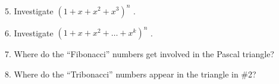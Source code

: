 \documentclass[10pt,]{book}
\theoremstyle{plain}
\theoremstyle{definition}
\theoremstyle{definition}
\theoremstyle{definition}
\numberwithin{equation}{chapter}
\begin{document}
\begin{exerciselist}
\par\smallskip
\item[5.]\hypertarget{exercise-31}{}\hypertarget{p-1706}{}%
Investigate \(\left( 1 + x + x^{2} + x^{3} \right)^{n}\) .%
\par\smallskip
\item[6.]\hypertarget{exercise-32}{}\hypertarget{p-1707}{}%
Investigate \(\left( 1 + x + x^{2} + \ldots + x^{k} \right)^{n}\) .%
\par\smallskip
\item[7.]\hypertarget{exercise-33}{}\hypertarget{p-1708}{}%
Where do the ``Fibonacci'' numbers get involved in the Pascal triangle?%
\par\smallskip
\item[8.]\hypertarget{exercise-34}{}\hypertarget{p-1709}{}%
Where do the ``Tribonacci'' numbers appear in the triangle in \#2?%
\par\smallskip
\end{exerciselist}
\typeout{************************************************}
\typeout{************************************************}
\end{document}

